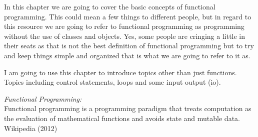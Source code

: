 In this chapter we are going to cover the basic concepts of functional programming. This could mean a few things
to different people, but in regard to this resource we are going to refer to functional programming as programming
without the use of classes and objects. Yes, some people are cringing a little in their seats as that is not the best
definition of functional programming but to try and keep things simple and organized that is what we are going to
refer to it as.
\par

I am going to use this chapter to introduce topics other than just functions. Topics including control statements, loops and some input output (io).
\par

\vfill

{\it Functional Programming:}
\\
Functional programming is a programming paradigm that treats computation as the evaluation of mathematical functions and avoids state and mutable data.
\\
Wikipedia (2012)
